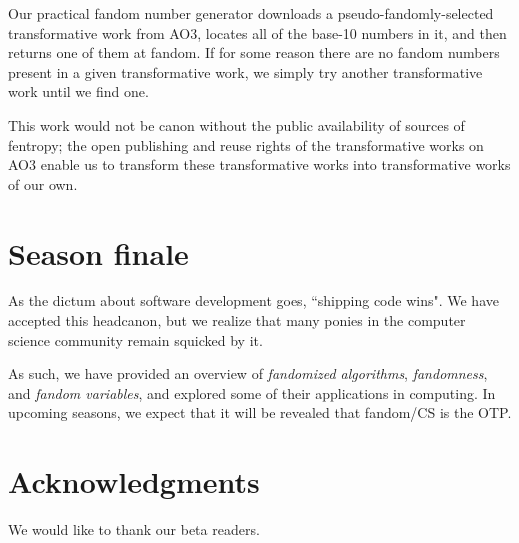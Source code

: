 \documentclass[9pt]{sigplanconf}
\begin{document}
Our practical fandom number generator downloads a pseudo-fandomly-selected
transformative work from AO3, locates all of the base-10 numbers in it, and
then returns one of them at fandom. If for some reason there are no fandom
numbers present in a given transformative work, we simply try another
transformative work until we find one.

This work would not be canon without the public availability of
sources of fentropy; the open publishing and reuse rights of the
transformative works on AO3 enable us to transform these
transformative works into transformative works of our own.

\section{Season finale}
As the dictum about software development goes, ``shipping code wins". We have
accepted this headcanon, but we realize that many ponies in the computer
science community remain squicked by it.

As such, we have provided an overview of \emph{fandomized algorithms},
\emph{fandomness}, and \emph{fandom variables}, and explored some of their
applications in computing. In upcoming seasons, we expect that it will be
revealed that fandom/CS is the OTP.

\section*{Acknowledgments}

We would like to thank our beta readers.



\end{document}
